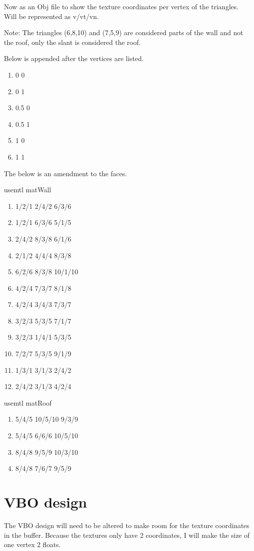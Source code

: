 \documentclass[10pt]{report}
\begin{document}
Now as an Obj file to show the texture coordinates per vertex of the triangles. Will be represented as v/vt/vn. 

Note: The triangles (6,8,10) and (7,5,9) are considered parts of the wall and not the roof, only the slant is considered the roof.

Below is appended after the vertices are listed.
\begin{enumerate}[vt ]
    \item 0 0  %
    \item 0 1  %
    \item 0.5 0  %
    \item 0.5 1  %
    \item 1 0  %
    \item 1 1  %
\end{enumerate}

The below is an amendment to the faces.

usemtl matWall
\begin{enumerate}[f]
    \item 1/2/1 2/4/2 6/3/6
    \item 1/2/1 6/3/6 5/1/5
    \item 2/4/2 8/3/8 6/1/6
    \item 2/1/2 4/4/4 8/3/8
    \item 6/2/6 8/3/8 10/1/10
    \item 4/2/4 7/3/7 8/1/8
    \item 4/2/4 3/4/3 7/3/7
    \item 3/2/3 5/3/5 7/1/7
    \item 3/2/3 1/4/1 5/3/5
    \item 7/2/7 5/3/5 9/1/9
    \item 1/3/1 3/1/3 2/4/2
    \item 2/4/2 3/1/3 4/2/4
\end{enumerate}
usemtl matRoof
\begin{enumerate}[f]
    \item 5/4/5 10/5/10 9/3/9
    \item 5/4/5 6/6/6 10/5/10
    \item 8/4/8 9/5/9 10/3/10
    \item 8/4/8 7/6/7 9/5/9
\end{enumerate}


\section{VBO design}
The VBO design will need to be altered to make room for the texture coordinates in the buffer. Because the textures only have 2 coordinates, I will make the size of one vertex 2 floats.
\end{document}
